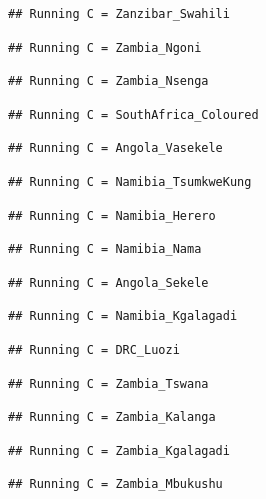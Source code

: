 \documentclass[
]{article}
\begin{document}
\begin{verbatim}
## Running C = Zanzibar_Swahili
\end{verbatim}

\begin{verbatim}
## Running C = Zambia_Ngoni
\end{verbatim}

\begin{verbatim}
## Running C = Zambia_Nsenga
\end{verbatim}

\begin{verbatim}
## Running C = SouthAfrica_Coloured
\end{verbatim}

\begin{verbatim}
## Running C = Angola_Vasekele
\end{verbatim}

\begin{verbatim}
## Running C = Namibia_TsumkweKung
\end{verbatim}

\begin{verbatim}
## Running C = Namibia_Herero
\end{verbatim}

\begin{verbatim}
## Running C = Namibia_Nama
\end{verbatim}

\begin{verbatim}
## Running C = Angola_Sekele
\end{verbatim}

\begin{verbatim}
## Running C = Namibia_Kgalagadi
\end{verbatim}

\begin{verbatim}
## Running C = DRC_Luozi
\end{verbatim}

\begin{verbatim}
## Running C = Zambia_Tswana
\end{verbatim}

\begin{verbatim}
## Running C = Zambia_Kalanga
\end{verbatim}

\begin{verbatim}
## Running C = Zambia_Kgalagadi
\end{verbatim}

\begin{verbatim}
## Running C = Zambia_Mbukushu
\end{verbatim}
\end{document}
